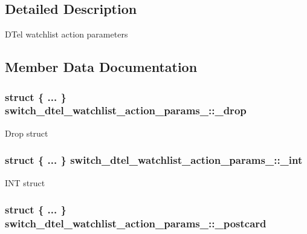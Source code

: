 \subsection{Detailed Description}
D\+Tel watchlist action parameters 

\subsection{Member Data Documentation}
\hypertarget{unionswitch__dtel__watchlist__action__params___aafb5463af915c31ae4b55a204600eefb}{
\subsubsection[{\+\_\+drop}]{\setlength{\rightskip}{0pt plus 5cm}struct \{ ... \}   switch\+\_\+dtel\+\_\+watchlist\+\_\+action\+\_\+params\+\_\+\+::\+\_\+drop}}\label{unionswitch__dtel__watchlist__action__params___aafb5463af915c31ae4b55a204600eefb}
Drop struct \hypertarget{unionswitch__dtel__watchlist__action__params___a36b810b8147ed34b920998b3d3aebc44}{
\subsubsection[{\+\_\+int}]{\setlength{\rightskip}{0pt plus 5cm}struct \{ ... \}   switch\+\_\+dtel\+\_\+watchlist\+\_\+action\+\_\+params\+\_\+\+::\+\_\+int}}\label{unionswitch__dtel__watchlist__action__params___a36b810b8147ed34b920998b3d3aebc44}
I\+N\+T struct \hypertarget{unionswitch__dtel__watchlist__action__params___aa8e51d31eefa8b4ed93c52ecf453f4e0}{
\subsubsection[{\+\_\+postcard}]{\setlength{\rightskip}{0pt plus 5cm}struct \{ ... \}   switch\+\_\+dtel\+\_\+watchlist\+\_\+action\+\_\+params\+\_\+\+::\+\_\+postcard}}\label{unionswitch__dtel__watchlist__action__params___aa8e51d31eefa8b4ed93c52ecf453f4e0}
